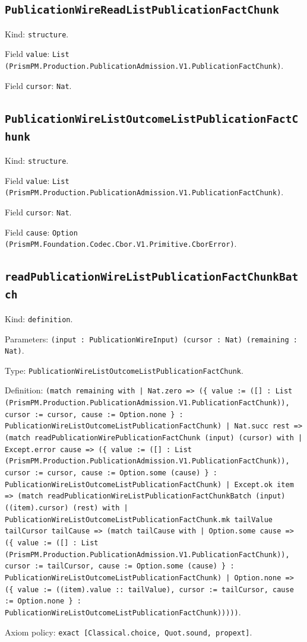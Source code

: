 \documentclass[11pt]{article}
\begin{document}
\subsection*{\texttt{PublicationWireReadListPublicationFactChunk}}
\noindent Kind: \texttt{structure}.\par
\noindent Field \texttt{value}: \texttt{List (PrismPM.Production.PublicationAdmission.V1.PublicationFactChunk)}.\par
\noindent Field \texttt{cursor}: \texttt{Nat}.\par
\subsection*{\texttt{PublicationWireListOutcomeListPublicationFactChunk}}
\noindent Kind: \texttt{structure}.\par
\noindent Field \texttt{value}: \texttt{List (PrismPM.Production.PublicationAdmission.V1.PublicationFactChunk)}.\par
\noindent Field \texttt{cursor}: \texttt{Nat}.\par
\noindent Field \texttt{cause}: \texttt{Option (PrismPM.Foundation.Codec.Cbor.V1.Primitive.CborError)}.\par
\subsection*{\texttt{readPublicationWireListPublicationFactChunkBatch}}
\noindent Kind: \texttt{definition}.\par
\noindent Parameters: \texttt{(input : PublicationWireInput) (cursor : Nat) (remaining : Nat)}.\par
\noindent Type: \texttt{PublicationWireListOutcomeListPublicationFactChunk}.\par
\noindent Definition: \texttt{(match remaining with | Nat.zero => (\{ value := ([] : List (PrismPM.Production.PublicationAdmission.V1.PublicationFactChunk)), cursor := cursor, cause := Option.none \} : PublicationWireListOutcomeListPublicationFactChunk) | Nat.succ rest => (match readPublicationWirePublicationFactChunk (input) (cursor) with | Except.error cause => (\{ value := ([] : List (PrismPM.Production.PublicationAdmission.V1.PublicationFactChunk)), cursor := cursor, cause := Option.some (cause) \} : PublicationWireListOutcomeListPublicationFactChunk) | Except.ok item => (match readPublicationWireListPublicationFactChunkBatch (input) ((item).cursor) (rest) with | PublicationWireListOutcomeListPublicationFactChunk.mk tailValue tailCursor tailCause => (match tailCause with | Option.some cause => (\{ value := ([] : List (PrismPM.Production.PublicationAdmission.V1.PublicationFactChunk)), cursor := tailCursor, cause := Option.some (cause) \} : PublicationWireListOutcomeListPublicationFactChunk) | Option.none => (\{ value := ((item).value :: tailValue), cursor := tailCursor, cause := Option.none \} : PublicationWireListOutcomeListPublicationFactChunk)))))}.\par
\noindent Axiom policy: \texttt{exact [Classical.choice, Quot.sound, propext]}.\par
\end{document}
